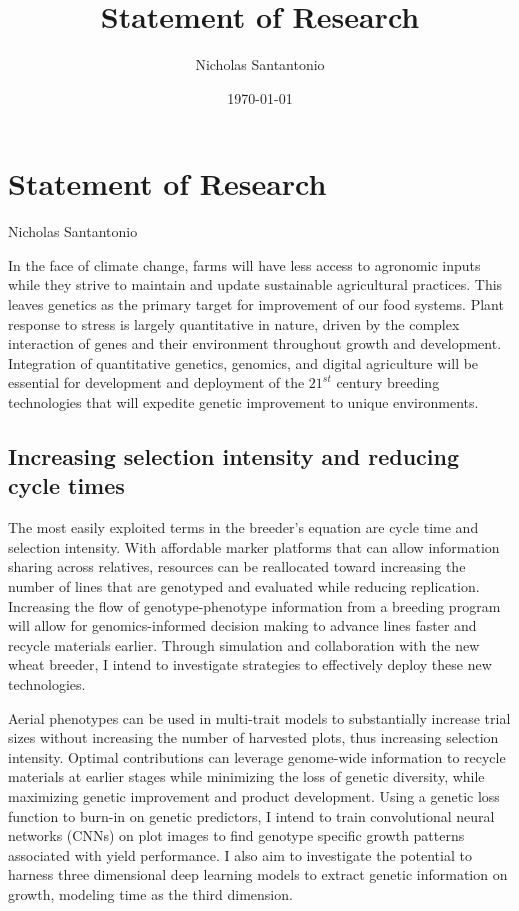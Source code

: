 \documentclass[11pt]{article}
\title{Statement of Research}
\author{Nicholas Santantonio}
\date{\today}
\begin{document}
\section*{\centering Statement of Research}
\begin{center} Nicholas Santantonio \end{center}

\noindent In the face of climate change, farms will have less access to agronomic inputs while they strive to maintain and update sustainable agricultural practices. This leaves genetics as the primary target for improvement of our food systems. Plant response to stress is largely quantitative in nature, driven by the complex interaction of genes and their environment throughout growth and development. Integration of quantitative genetics, genomics, and digital agriculture will be essential for development and deployment of the $21^{st}$ century breeding technologies that will expedite genetic improvement to unique environments.

\subsection*{Increasing selection intensity and reducing cycle times}

The most easily exploited terms in the breeder's equation are cycle time and selection intensity. With affordable marker platforms that can allow information sharing across relatives, resources can be reallocated toward increasing the number of lines that are genotyped and evaluated while reducing replication. Increasing the flow of genotype-phenotype information from a breeding program will allow for genomics-informed decision making to advance lines faster and recycle materials earlier. Through simulation and collaboration with the new wheat breeder, I intend to investigate strategies to effectively deploy these new technologies.%

Aerial phenotypes can be used in multi-trait models to substantially increase trial sizes without increasing the number of harvested plots, thus increasing selection intensity. Optimal contributions can leverage genome-wide information to recycle materials at earlier stages while minimizing the loss of genetic diversity, while  maximizing genetic improvement and product development. Using a genetic loss function to burn-in on genetic predictors, I intend to train convolutional neural networks (CNNs) on plot images to find genotype specific growth patterns associated with yield performance. I also aim to investigate the potential to harness three dimensional deep learning models to extract genetic information on growth, modeling time as the third dimension.
\end{document}
